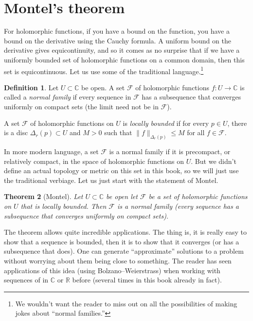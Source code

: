 \documentclass[12pt,openany]{book}
\newcommand{\snorm}[1]{\lVert {#1} \rVert}
\newcommand{\C}{{\mathbb{C}}}
\newcommand{\R}{{\mathbb{R}}}
\newcommand{\sF}{{\mathscr{F}}}
\newcommand{\myindex}[1]{#1\index{#1}}
\theoremstyle{plain}
\newtheorem{thm}{Theorem}[section]
\theoremstyle{remark}
\theoremstyle{definition}
\newtheorem{defn}[thm]{Definition}
\theoremstyle{exercise}
\theoremstyle{example}
\begin{document}

\section{Montel's theorem}
\label{sec:montel}

For holomorphic functions, if you have a bound on the function, you have a
bound on the derivative using the Cauchy formula.  A uniform
bound on the derivative gives equicontinuity, and
so it comes as no
surprise that if we have a uniformly bounded set of holomorphic functions
on a common domain, then this set is equicontinuous.
Let us use some of the traditional language.\footnote{%
We wouldn't want the reader to miss out on all the possibilities of making
jokes about ``normal families.''}

\begin{defn}
Let $U \subset \C$ be open.
A set $\sF$ of holomorphic functions $f \colon U \to \C$ is called a
\emph{\myindex{normal family}} if every sequence in $\sF$ has a subsequence
that converges uniformly on compact sets (the limit need not be in $\sF$).

A set $\sF$ of holomorphic functions on $U$ is \emph{\myindex{locally bounded}}
if for every $p \in U$, there is a disc $\Delta_r(p) \subset U$ and $M > 0$
such that 
$\snorm{f}_{\Delta_r(p)} \leq M$ for all $f \in \sF$.
\end{defn}

In more modern language, a set $\sF$ is a normal family if it is precompact, or
relatively compact, in the space of holomorphic functions on $U$.  But we
didn't define an actual topology or metric on this set in this book, so
we will just use the traditional verbiage.
Let us just start with the statement of Montel.

\begin{thm}[Montel]
Let $U \subset \C$ be open let $\sF$
be a set of holomorphic functions on $U$ that is locally bounded.
Then $\sF$ is a normal family (every sequence has a subsequence that
converges uniformly on compact sets).
\end{thm}

The theorem allows quite incredible applications.  The thing is, it is
really easy to show that a sequence is bounded, then it is to show that it
converges (or has a subsequence that does).  One can generate
``approximate'' solutions to a problem without worrying about them being
close to something.  The reader has seen applications of this idea
(using Bolzano--Weierstrass)
when working with sequences of in $\C$ or $\R$ before (several times in this
book already in fact).
\end{document}
